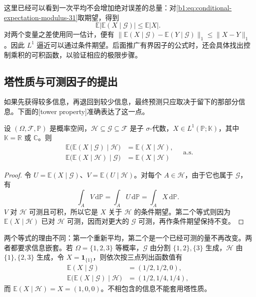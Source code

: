 这里已经可以看到一次平均不会增加绝对误差的总量：对\eqref{b1:eq:conditional-expectation-modulus-31}取期望，得到
\[
 \mathbb E|\mathbb E(X\mid\mathcal G)|\leq\mathbb E|X|.
\]
对两个变量之差使用同一估计，便有
\(\|\mathbb E(X\mid\mathcal G)-\mathbb E(Y\mid\mathcal G)\|_1\leq\|X-Y\|_1\)。因此 \(L^1\) 逼近可以通过条件期望。后面推广有界因子的公式时，还会具体找出控制乘积的可积函数，以验证相应的极限步骤。

\subsection{塔性质与可测因子的提出}
\label{b1:subsec:310202}

如果先获得较多信息，再退回到较少信息，最终预测只应取决于留下的那部分信息。下面的[tower property]准确表达了这一点。

\begin{proposition}[塔性质]\label{b1:prop:conditional-expectation-tower-31}
设 \((\Omega,\mathcal F,\mathbb P)\) 是概率空间，\(\mathcal H\subseteq\mathcal G\subseteq\mathcal F\) 是子 \(\sigma\)-代数，\(X\in L^1(\mathbb P;\mathbb K)\)，其中 \(\mathbb K=\mathbb R\) 或 \(\mathbb C\)。则
\[
 \begin{aligned}
  \mathbb E\bigl(\mathbb E(X\mid\mathcal G)\mid\mathcal H\bigr)
    &=\mathbb E(X\mid\mathcal H),\\
  \mathbb E\bigl(\mathbb E(X\mid\mathcal H)\mid\mathcal G\bigr)
    &=\mathbb E(X\mid\mathcal H)
 \end{aligned}
 \quad\text{a.s.}
\]
\end{proposition}
\begin{proof}
令 \(U=\mathbb E(X\mid\mathcal G)\)、\(V=\mathbb E(U\mid\mathcal H)\)。对每个 \(A\in\mathcal H\)，由于它也属于 \(\mathcal G\)，有
\[
 \int_A V\,\mathrm d\mathbb P
 =\int_A U\,\mathrm d\mathbb P
 =\int_A X\,\mathrm d\mathbb P.
\]
\(V\) 对 \(\mathcal H\) 可测且可积，所以它是 \(X\) 关于 \(\mathcal H\) 的条件期望。第二个等式则因为 \(\mathbb E(X\mid\mathcal H)\) 已对 \(\mathcal H\) 可测，因而对更大的 \(\mathcal G\) 可测，再作条件期望保持不变。
\end{proof}

两个等式的理由不同：第一个重新平均，第二个是一个已经可测的量不再改变。两者都要求信息嵌套。若 \(\Omega=\{1,2,3\}\) 等概率，\(\mathcal G\) 由分割 \(\{1,2\},\{3\}\) 生成，\(\mathcal H\) 由 \(\{1\},\{2,3\}\) 生成，令 \(X=\mathbf1_{\{1\}}\)，则依次按三点列出函数值有
\[
 \begin{aligned}
  \mathbb E(X\mid\mathcal G)&=(1/2,1/2,0),\\
  \mathbb E\bigl(\mathbb E(X\mid\mathcal G)\mid\mathcal H\bigr)
  &=(1/2,1/4,1/4),
 \end{aligned}
\]
而 \(\mathbb E(X\mid\mathcal H)=X=(1,0,0)\)。不相包含的信息不能套用塔性质。


